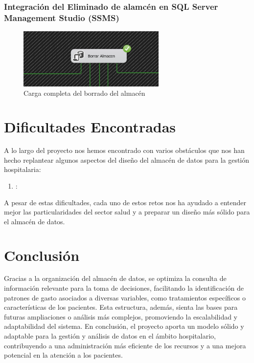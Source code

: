 \documentclass{article}
\begin{document}
\subsubsection{Integración del Eliminado de alamcén en SQL Server Management Studio (SSMS)}



\begin{figure}[H]
	\begin{center} 
		\includegraphics[width=0.65\textwidth]{images/completados/borrado_almacen.png} %
		\caption{Carga completa del borrado del almacén}
		\label{fig:borrado_completo}
	\end{center}
\end{figure}

\section{Dificultades Encontradas}
\label{sec:dificultades_encontradas}

A lo largo del proyecto nos hemos encontrado con varios obstáculos que nos han hecho replantear algunos aspectos del diseño del almacén de datos para la gestión hospitalaria:

\begin{enumerate}
	\item \textbf{}:
\end{enumerate}

A pesar de estas dificultades, cada uno de estos retos nos ha ayudado a entender mejor las particularidades del sector salud y a preparar un diseño más sólido para el almacén de datos.

\section{Conclusión}
\label{sec:conclusion}

Gracias a la organización del almacén de datos, se optimiza la consulta de información relevante para la toma de decisiones, facilitando la identificación de patrones de gasto asociados a diversas variables, como tratamientos específicos o características de los pacientes. Esta estructura, además, sienta las bases para futuras ampliaciones o análisis más complejos, promoviendo la escalabilidad y adaptabilidad del sistema. En conclusión, el proyecto aporta un modelo sólido y adaptable para la gestión y análisis de datos en el ámbito hospitalario, contribuyendo a una administración más eficiente de los recursos y a una mejora potencial en la atención a los pacientes.
\end{document}
